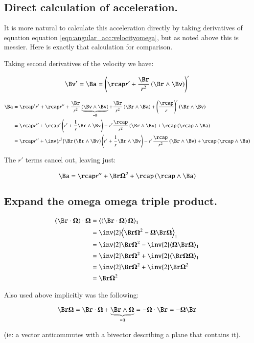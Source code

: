 \subsection{Direct calculation of acceleration. }

It is more natural to calculate this acceleration directly by taking derivatives of equation
equation \ref{eqn:angular_acc:velocityomega}, but as noted above this is messier.  Here is exactly that calculation for
comparison.

Taking second derivatives of the velocity we have:

\[
\Bv' = \Ba = \left(\rcap r' + \frac{\Br}{r^2} \left(\Br \wedge \Bv\right)\right)'
\]

\begin{align*}
\Ba
&= \rcap' r' + \rcap r'' + \frac{\Br}{r^2} \underbrace{\left(\Bv \wedge \Bv\right)}_{=0} + \frac{\Br}{r^2} \left(\Br \wedge \Ba\right) + \left(\frac{\rcap}{r}\right)' \left(\Br \wedge \Bv\right) \\
&=
\rcap r''
+\rcap'\left( r'  + \frac{1}{r} \Br \wedge \Bv \right)
- r' \frac{\rcap}{r^2} \left(\Br \wedge \Bv\right)
+ \rcap \left(\rcap \wedge \Ba\right)  \\
&=
\rcap r''
+\inv{r^3} \Br\left( \Br \wedge \Bv\right) \left( r'  + \frac{1}{r} \Br \wedge \Bv \right)
- r' \frac{\rcap}{r^2} \left(\Br \wedge \Bv\right)
+ \rcap \left(\rcap \wedge \Ba\right)  \\
\end{align*}

The $r'$ terms cancel out, leaving just:

\[
\Ba = \rcap r'' + \Br \BOmega^2 +
\rcap \left(\rcap \wedge \Ba\right)
\]

\subsection{Expand the omega omega triple product. }

\begin{align*}
\left(\Br \cdot \BOmega\right) \cdot \BOmega
&= \gpgradeone{ \left(\Br \cdot \BOmega\right) \BOmega } \\
&= \inv{2} \gpgradeone{ \Br \BOmega^2 - \BOmega \Br \BOmega } \\
&= \inv{2} \Br \BOmega^2 - \inv{2}\gpgradeone{ \BOmega \Br \BOmega } \\
&= \inv{2} \Br \BOmega^2 + \inv{2}\gpgradeone{ \Br \BOmega \BOmega } \\
&= \inv{2} \Br \BOmega^2 + \inv{2}\Br \BOmega^2 \\
&= \Br \BOmega^2 \\
\end{align*}

Also used above implicitly was the following:

\[
\Br \BOmega = \Br \cdot \BOmega + \underbrace{\Br \wedge \BOmega}_{=0} = -\BOmega \cdot \Br = -\BOmega \Br
\]

(ie: a vector anticommutes with a bivector describing a plane that contains it).
